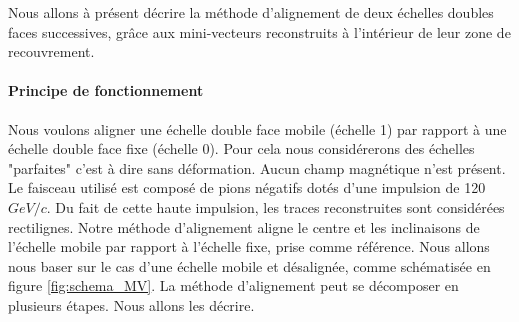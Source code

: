   Nous allons \`a pr\'esent d\'ecrire la m\'ethode d'alignement de deux \'echelles doubles faces successives, gr\^ace aux mini-vecteurs reconstruits \`a l'int\'erieur de leur zone de recouvrement.
 
   \paragraph{Principe de fonctionnement}
   
   Nous voulons aligner une \'echelle double face mobile (\'echelle 1) par rapport \`a une \'echelle double face fixe (\'echelle 0). Pour cela nous consid\'ererons des \'echelles "parfaites" c'est \`a dire sans d\'eformation. Aucun champ magn\'etique n'est pr\'esent. Le faisceau utilis\'e est compos\'e de pions n\'egatifs dot\'es d'une impulsion de 120 $GeV/c$. Du fait de cette haute impulsion, les traces reconstruites sont consid\'er\'ees rectilignes. Notre m\'ethode d'alignement aligne le centre et les inclinaisons de l'\'echelle mobile par rapport \`a l'\'echelle fixe, prise comme r\'ef\'erence. Nous allons nous baser sur le cas d'une \'echelle mobile et d\'esalign\'ee, comme sch\'ematis\'ee en figure \ref{fig:schema_MV}. La m\'ethode d'alignement peut se d\'ecomposer en plusieurs \'etapes. Nous allons les d\'ecrire.
   
   \medskip
   

